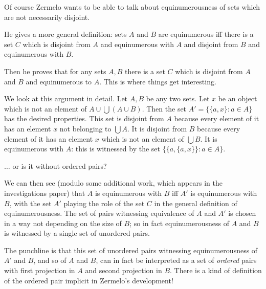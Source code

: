 \documentclass{slides}
\begin{document}
\begin{slide}

Of course Zermelo wants to be able to talk about equinumerousness of sets which are not necessarily disjoint.

He gives a more general definition:  sets $A$ and $B$ are equinumerous iff there is a set $C$ which is disjoint from $A$ and equinumerous with  $A$ and disjoint from $B$ and equinumerous with  $B$.

Then he proves that for any sets $A, B$ there is a set $C$ which is disjoint from $A$ and $B$ and equinumerous to $A$.  This is where things get interesting.

\end{slide}

\begin{slide}

We look at this argument in detail.  Let $A,B$ be any two sets.  Let $x$ be an object which is not an element of $A \cup \bigcup(A \cup B)$.  Then the set
$A'= \{\{a,x\} : a \in A\}$ has the desired properties.  This set is disjoint from $A$ because every element of it has an element $x$ not belonging to $\bigcup A$.
It is disjoint from $B$ because every element of it has an element $x$ which is not an element of $\bigcup B$.   It is equinumerous with $A$:  this is witnessed by the
set $\{\{a,\{a,x\}\}: a \in A\}$.

\end{slide}

\begin{slide}

{\Large $\ldots$ or is it without ordered pairs?}

We can then see (modulo some additional work, which appears in the investigations paper) that $A$ is equinumerous with $B$ iff $A'$ is equinumerous with $B$, with the set $A'$ playing the role of
the set $C$ in the general definition of equinumerousness.  The set of pairs witnessing equivalence of $A$ and $A'$ is chosen in a way not depending on the size of $B$; so in fact
equinumerousness of $A$ and $B$  is witnessed by a single set of unordered pairs.

The punchline is that this set of unordered pairs witnessing equinumerousness of $A'$ and $B$, and so of $A$ and $B$, can in fact be interpreted as a set of {\em ordered\/} pairs with first projection in $A$ and second projection in $B$.
There is a kind of definition of the ordered pair implicit in Zermelo's development!

\end{slide}
\end{document}
